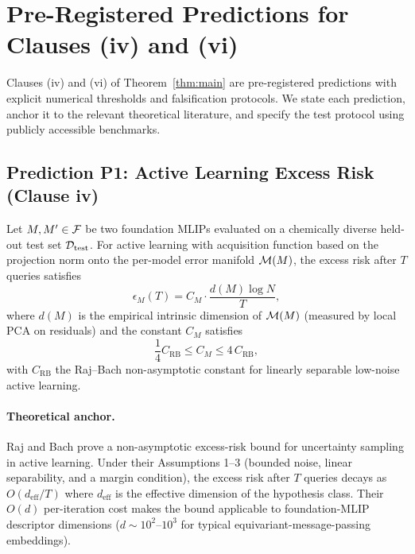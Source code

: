 \section{Pre-Registered Predictions for Clauses (iv) and (vi)}\label{sec:predictions}

Clauses (iv) and (vi) of Theorem~\ref{thm:main} are pre-registered predictions with explicit numerical thresholds and falsification protocols. We state each prediction, anchor it to the relevant theoretical literature, and specify the test protocol using publicly accessible benchmarks.

\subsection{Prediction P1: Active Learning Excess Risk (Clause iv)}\label{sec:prediction-p1}

\begin{prediction}\label{pred:al}
Let $M, M' \in \mathcal{F}$ be two foundation MLIPs evaluated on a chemically diverse held-out test set $\mathcal{D}_{\text{test}}$. For active learning with acquisition function based on the projection norm onto the per-model error manifold $\mathcal{M}(M)$, the excess risk after $T$ queries satisfies
\begin{equation}\label{eq:al-prediction}
    \epsilon_M(T) = C_M \cdot \frac{d(M) \log N}{T},
\end{equation}
where $d(M)$ is the empirical intrinsic dimension of $\mathcal{M}(M)$ (measured by local PCA on residuals) and the constant $C_M$ satisfies
\begin{equation}\label{eq:al-constant}
    \frac{1}{4} C_{\text{RB}} \leq C_M \leq 4 \, C_{\text{RB}},
\end{equation}
with $C_{\text{RB}}$ the Raj--Bach\cite{raj2022convergence} non-asymptotic constant for linearly separable low-noise active learning.
\end{prediction}

\paragraph{Theoretical anchor.} Raj and Bach\cite{raj2022convergence} prove a non-asymptotic excess-risk bound for uncertainty sampling in active learning. Under their Assumptions 1--3 (bounded noise, linear separability, and a margin condition), the excess risk after $T$ queries decays as $O(d_{\text{eff}} / T)$ where $d_{\text{eff}}$ is the effective dimension of the hypothesis class. Their $O(d)$ per-iteration cost makes the bound applicable to foundation-MLIP descriptor dimensions ($d \sim 10^2$--$10^3$ for typical equivariant-message-passing embeddings).

